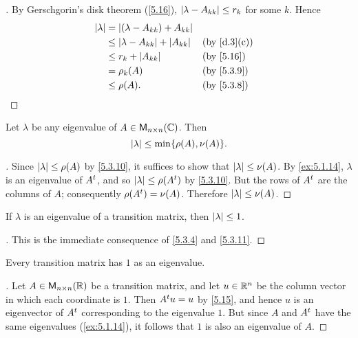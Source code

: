 \begin{proof}[]
  By Gerschgorin's disk theorem (\cref{5.16}), \(\left\lvert\lambda - A_{k k}\right\rvert \leq r_k\) for some \(k\).
  Hence
  \begin{align*}
    \abs{\lambda} & = \abs{(\lambda - A_{k k}) + A_{k k}}                                       \\
                  & \leq \abs{\lambda - A_{k k}} + \abs{A_{k k}} &  & \text{(by \cref{d.3}(c))} \\
                  & \leq r_k + \abs{A_{k k}}                     &  & \text{(by \cref{5.16})}   \\
                  & = \rho_k(A)                                  &  & \text{(by \cref{5.3.9})}  \\
                  & \leq \rho(A).                                &  & \text{(by \cref{5.3.8})}
  \end{align*}
\end{proof}

\begin{cor}\label{5.3.11}
  Let \(\lambda\) be any eigenvalue of \(A \in \mathsf{M}_{{n} \times n}({\mathbb{C}})\).
  Then
  \[
    \abs{\lambda} \leq \min\set{\rho(A), \nu(A)}.
  \]
\end{cor}

\begin{proof}[]
  Since \(\left\lvert\lambda\right\rvert \leq \rho(A)\) by \cref{5.3.10}, it suffices to show that \(\left\lvert\lambda\right\rvert \leq \nu(A)\).
  By \cref{ex:5.1.14}, \(\lambda\) is an eigenvalue of \({A}^{t}\), and so \(\left\lvert\lambda\right\rvert \leq \rho({A}^{t})\) by \cref{5.3.10}.
  But the rows of \({A}^{t}\) are the columns of \(A\);
  consequently \(\rho({A}^{t}) = \nu(A)\).
  Therefore \(\left\lvert\lambda\right\rvert \leq \nu(A)\).
\end{proof}

\begin{cor}\label{5.3.12}
  If \(\lambda\) is an eigenvalue of a transition matrix, then \(\left\lvert\lambda\right\rvert \leq 1\).
\end{cor}

\begin{proof}[]
  This is the immediate consequence of \cref{5.3.4} and \cref{5.3.11}.
\end{proof}

\begin{thm}\label{5.17}
  Every transition matrix has \(1\) as an eigenvalue.
\end{thm}

\begin{proof}[]
  Let \(A \in \mathsf{M}_{{n} \times n}({\mathbb{R}})\) be a transition matrix, and let \(u \in \mathbb{R}^n\) be the column vector in which each coordinate is \(1\).
  Then \({A}^{t} u = u\) by \cref{5.15}, and hence \(u\) is an eigenvector of \({A}^{t}\) corresponding to the eigenvalue \(1\).
  But since \(A\) and \({A}^{t}\) have the same eigenvalues (\cref{ex:5.1.14}), it follows that \(1\) is also an eigenvalue of \(A\).
\end{proof}

